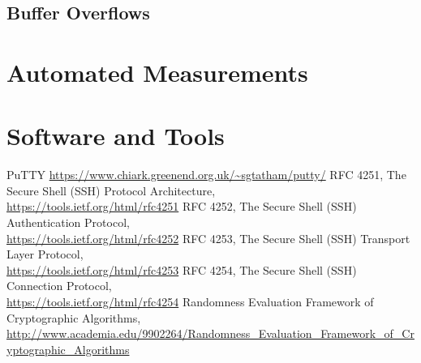 \documentclass{report}
\begin{document}
\section{Buffer Overflows}
\begin{appendices}
\chapter{Automated Measurements}
\chapter{Software and Tools}
\end{appendices}
\begin{thebibliography}{9}
PuTTY
\url{https://www.chiark.greenend.org.uk/~sgtatham/putty/}
RFC 4251, The Secure Shell (SSH) Protocol Architecture,\\
\url{https://tools.ietf.org/html/rfc4251}
RFC 4252, The Secure Shell (SSH) Authentication Protocol,\\  \url{https://tools.ietf.org/html/rfc4252}
RFC 4253, The Secure Shell (SSH) Transport Layer Protocol,\\ \url{https://tools.ietf.org/html/rfc4253}
RFC 4254, The Secure Shell (SSH) Connection Protocol,\\ \url{https://tools.ietf.org/html/rfc4254}
Randomness Evaluation Framework of Cryptographic Algorithms,\\
\url{http://www.academia.edu/9902264/Randomness_Evaluation_Framework_of_Cryptographic_Algorithms}
\end{thebibliography}
\listoffigures
\end{document}
